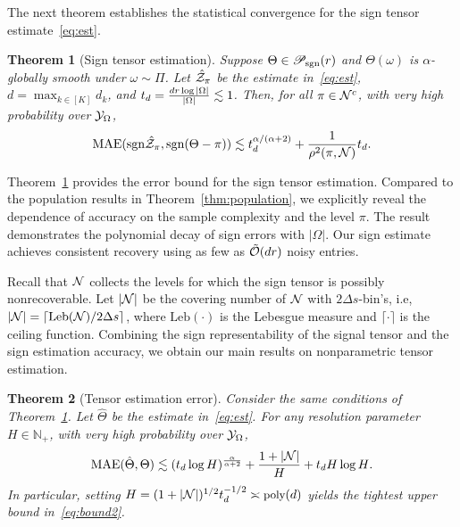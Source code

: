 \documentclass{article}
\theoremstyle{plain}
\newtheorem{thm}{Theorem}
\theoremstyle{definition}
\def\sign{\textup{sgn}}
\def\caliP{\mathscr{P}_{\textup{sgn}}}
\begin{document}
The next theorem establishes the statistical convergence for the sign tensor estimate~\eqref{eq:est}.

\begin{thm}[Sign tensor estimation]\label{thm:classification} Suppose $\Theta\in\caliP(r)$ and $\Theta(\omega)$ is $\alpha$-globally smooth under $\omega\sim \Pi$. Let $\hat {\mathcal{Z}}_\pi$ be the estimate in~\eqref{eq:est}, $d=\max_{k\in[K]}d_k$, and $t_d ={dr\log|\Omega|\over |\Omega|}\lesssim 1$. Then, for all $\pi\in\mathcal{N}^c$, with very high probability over $\mathcal{Y}_\Omega$, 
\begin{align}\label{eq:bound}
\textup{MAE}(\sign \hat \tZ_\pi, \sign(\Theta-\pi)) \lesssim t_d^{\alpha/( \alpha+2)}+{1 \over \rho^2(\pi, \tN)}t_d.
\end{align}
\end{thm}
Theorem~\ref{thm:classification} provides the error bound for the sign tensor estimation. Compared to the population results in Theorem~\ref{thm:population}, we explicitly reveal the dependence of accuracy on the sample complexity and the level $\pi$. The result demonstrates the polynomial decay of sign errors with $|\Omega|$.  Our sign estimate achieves consistent recovery using as few as $\tilde {\mathcal{O}}(dr)$ noisy entries. 

Recall that $\mathcal{N}$ collects the levels for which the sign tensor is possibly nonrecoverable. Let $|\mathcal{N}|$ be the covering number of $\mathcal{N}$ with $2\Delta s$-bin's, i.e, $|\mathcal{N}| = \lceil \text{Leb}(\mathcal{N})/2\Delta s \rceil$, where $\text{Leb}(\cdot)$ is the Lebesgue measure and $\lceil \cdot \rceil$ is the ceiling function. Combining the sign representability of the signal tensor and the sign estimation accuracy, we obtain our main results on nonparametric tensor estimation. 


\begin{thm}[Tensor estimation error]\label{thm:estimation} Consider the same conditions of Theorem~\ref{thm:classification}. Let $\hat \Theta$ be the estimate in~\eqref{eq:est}. For any resolution parameter $H\in\mathbb{N}_{+}$, with very high probability over $\mathcal{Y}_\Omega$,
\begin{equation}\label{eq:bound2}
\textup{MAE}(\hat \Theta, \Theta)\lesssim (t_d\log H)^{\alpha\over \alpha+2}+{1+|\mathcal{N}|\over H}+{t_dH\log H}.
\end{equation}
In particular, setting $\footnotesize H= (1+|\tN|)^{1/2} t_d^{-1/2}\asymp \text{poly}(d)$ yields the tightest upper bound in~\eqref{eq:bound2}.
\end{thm}
\end{document}
